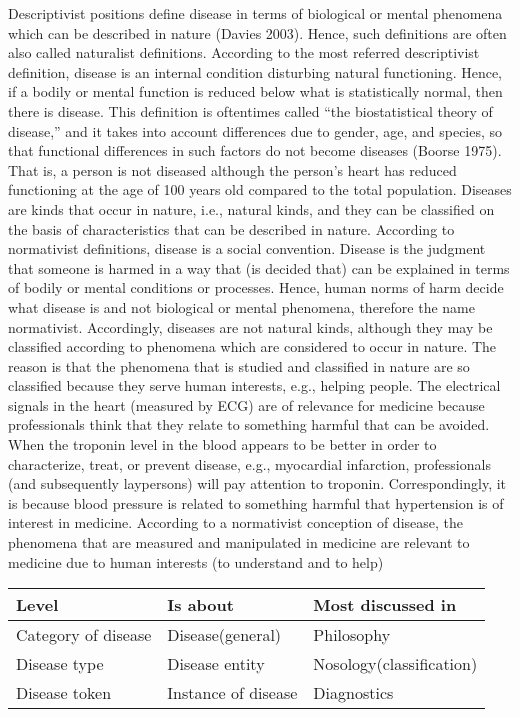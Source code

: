 \documentclass[conference]{IEEEtran}
\begin{document}
Descriptivist positions deﬁne disease in terms of biological or mental phenomena which can be described in nature (Davies 2003). Hence, such deﬁnitions are often also called naturalist deﬁnitions. According to the most referred descriptivist deﬁnition, disease is an internal condition disturbing natural functioning. Hence, if a bodily or mental function is reduced below what is statistically normal, then there is disease. This deﬁnition is oftentimes called “the biostatistical theory of disease,” and it takes into account differences due to gender, age, and species, so that functional differences in such factors do not become diseases (Boorse 1975). That is, a person is not diseased although the person’s heart has reduced functioning at the age of 100 years old compared to the total population. Diseases are kinds that occur in nature, i.e., natural kinds, and they can be classiﬁed on the basis of characteristics that can be described in nature.
According to normativist deﬁnitions, disease is a social convention. \cite{b2}Disease is the judgment that someone is harmed in a way that (is decided that) can be explained in terms of bodily or mental conditions or processes. Hence, human norms of harm decide what disease is and not biological or mental phenomena, therefore the name normativist. Accordingly, diseases are not natural kinds, although they may be classiﬁed according to phenomena which are considered to occur in nature. The reason is that the phenomena that is studied and classiﬁed in nature are so classiﬁed because they serve human interests, e.g., helping people. The electrical signals in the heart (measured by ECG) are of relevance for medicine because professionals think that they relate to something harmful that can be avoided. When the troponin level in the blood appears to be better in order to characterize, treat, or prevent disease, e.g., myocardial infarction, professionals (and subsequently laypersons) will pay attention to troponin. Correspondingly, it is because blood pressure is related to something harmful that hypertension is of interest in medicine. According to a normativist conception of disease, the phenomena that are measured and manipulated in medicine are relevant to medicine due to human interests (to understand and to help)

\begin{tabular}{ |p{2cm}|p{2cm}|p{2cm}|  }
\hline

\textbf{Level}& \textbf{Is about}&\textbf{Most discussed in}\\
\hline
Category of disease & Disease(general) &Philosophy\\
\hline
Disease type& Disease entity   & Nosology(classification)\\
\hline
Disease token &Instance of disease & Diagnostics \\

\hline
\end{tabular}
\end{document}
